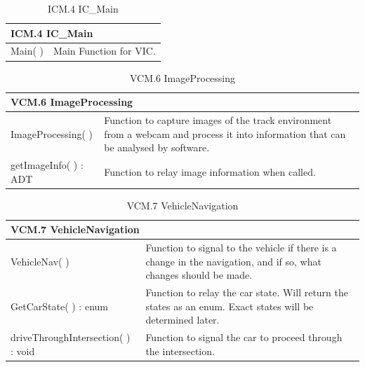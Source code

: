 \documentclass [10pt]{article}
\begin{document}
\begin{longtable}{| p{ } | p{ } | }\caption{ICM.4 IC\_Main} \\\hline  
 \multicolumn{2}{|l|}{\textbf {ICM.4 IC\_Main}}\\ \hline
 
\cellcolor{tableCell}Main( ) & \cellcolor{tableCell}Main Function for VIC. \\ \hline 




\end{longtable}


\begin{longtable}{| p{ } | p{ } | }\caption{VCM.6 ImageProcessing} \\\hline  
 \multicolumn{2}{|l|}{\textbf {VCM.6 ImageProcessing}}\\ \hline
\cellcolor{tableCell}ImageProcessing( ) & \cellcolor{tableCell}Function to capture images of the track environment from a webcam and process it into information that can be analysed by software.  \\ \hline 

getImageInfo( ) : ADT & Function to relay image information when called.  \\ \hline 


\end{longtable}

\begin{longtable}{| p{ } | p{ } | }\caption{VCM.7 VehicleNavigation} \\\hline  
 \multicolumn{2}{|l|}{\textbf {VCM.7 VehicleNavigation}}\\ \hline
\cellcolor{tableCell}VehicleNav( ) & \cellcolor{tableCell}Function to signal to the vehicle if there is a change in the navigation, and if so, what changes should be made. \\ \hline 

GetCarState( ) : enum &Function to relay the car state. Will return the states as an enum. Exact states will be determined later. \\ \hline 

\cellcolor{tableCell}driveThroughIntersection( ) : void & \cellcolor{tableCell}Function to signal the car to proceed through the intersection. 
\\ \hline

\end{longtable}
\end{document}
